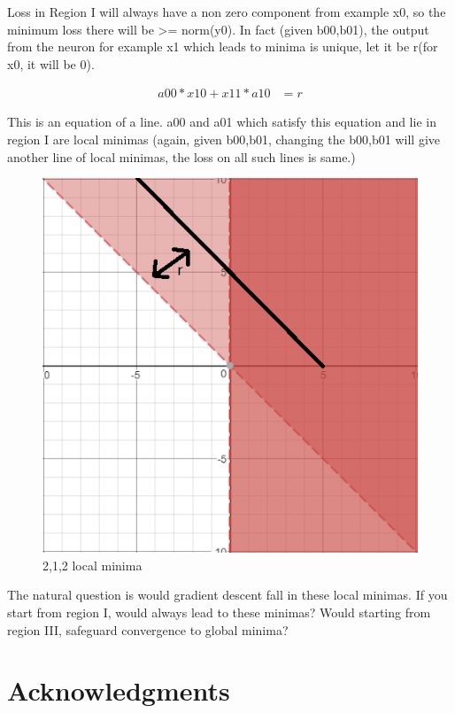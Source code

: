 \documentclass[conference]{IEEEtran}
\begin{document}
Loss in Region I will always have a non zero component from example x0, so the minimum loss there will be >= norm(y0).
In fact (given b00,b01), the output from the neuron for example x1 which leads to minima is unique, let it be r(for x0, it will be 0). 

\begin{align}
a00*x10 + x11*a10 &= r
\end{align} 

This is an equation of a line. a00 and a01 which satisfy this equation and lie in region I are local minimas (again, given b00,b01, changing the b00,b01 will give another line of local minimas, the loss on all such lines is same.)

\begin{figure}
	\includegraphics[width=\linewidth]{images/nn/212r.png}
	\caption{2,1,2 local minima}
	\label{fig:212localminima}
\end{figure}

The natural question is would gradient descent fall in these local minimas. If you start from region I, would always lead to these minimas? Would starting from region III, safeguard convergence to global minima?


\section*{Acknowledgments}




\end{document}
